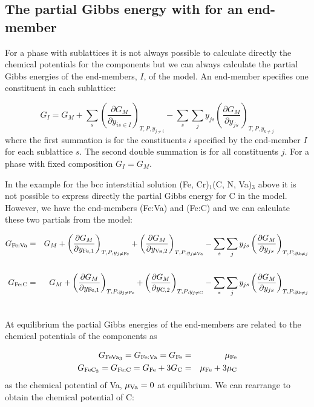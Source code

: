 \documentclass[12pt]{article}
\begin{document}
\subsection{The partial Gibbs energy with for an end-member}

For a phase with sublattices it is not always possible to calculate
directly the chemical potentials for the components but we can always
calculate the partial Gibbs energies of the end-members, $I$, of the
model.  An end-member specifies one constituent in each sublattice:

\begin{equation}
G_I=G_M + \sum_{s}\left(\frac{\partial G_M}{\partial y_{is\in I}}
\right)_{T,P,y_{j\ne i}}
- \sum_s \sum_{j} y_{js}\left(\frac{\partial G_M}{\partial y_{js}}
\right)_{T,P,y_{k\ne j}} \label{eq:mufory}
\end{equation}
where the first summation is for the constituents $i$ specified by the
end-member $I$ for each sublattice $s$.  The second double summation is
for all constituents $j$.  For a phase with fixed composition $G_I = G_M$.

In the example for the bcc interstitial solution (Fe, Cr)$_1$(C, N,
Va)$_3$ above it is not possible to express directly the partial Gibbs
energy for C in the model.  However, we have the end-members (Fe:Va)
and (Fe:C) and we can calculate these two partials from the model:

\begin{eqnarray}
G_{\rm Fe:Va}&=&G_M + \left(\frac{\partial G_M}{\partial y_{\rm Fe,1}}
\right)_{T,P,y_{j\ne {\rm Fe}}} +
\left(\frac{\partial G_M}{\partial y_{\rm Va,2}}
\right)_{T,P,y_{j\ne {\rm Va}}}
- \sum_s \sum_{j} y_{js}\left(\frac{\partial G_M}{\partial y_{js}}
\right)_{T,P,y_{k\ne j}} \nonumber\\&&\\
G_{\rm Fe:C}&=&G_M + \left(\frac{\partial G_M}{\partial y_{\rm Fe,1}}
\right)_{T,P,y_{j\ne {\rm Fe}}} +
\left(\frac{\partial G_M}{\partial y_{\rm C,2}}
\right)_{T,P,y_{j\ne {\rm C}}}
- \sum_s \sum_{j} y_{js}\left(\frac{\partial G_M}{\partial y_{js}}
\right)_{T,P,y_{k\ne j}} \nonumber\\&&
\end{eqnarray}

At equilibrium the partial Gibbs energies of the end-members are
related to the chemical potentials of the components as

\begin{eqnarray*}
G_{\rm FeVa_3} = G_{\rm Fe:Va} = G_{\rm Fe} &=& \mu_{\rm Fe}\\
G_{\rm FeC_3} = G_{\rm Fe:C} = G_{\rm Fe} + 3G_{\rm C} &=&
\mu_{\rm Fe} + 3\mu_{\rm C}
\end{eqnarray*}
as the chemical potential of Va, $\mu_{\rm Va}=0$ at equilibrium.  We
can rearrange to obtain the chemical potential of C:
\end{document}
